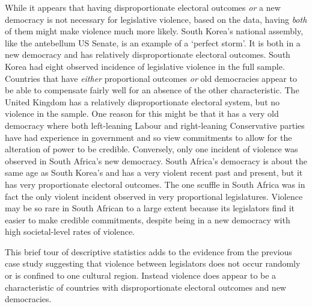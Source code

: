 \documentclass[a4paper]{article}\usepackage[]{graphicx}\usepackage[]{color}
\begin{document}
While it appears that having disproportionate electoral outcomes \emph{or} a new democracy is not necessary for legislative violence, based on the data, having \emph{both} of them might make violence much more likely. South Korea's national assembly, like the antebellum US Senate, is an example of a `perfect storm'. It is both in a new democracy and has relatively disproportionate electoral outcomes. South Korea had eight observed incidence of legislative violence in the full sample. Countries that have \emph{either} proportional outcomes \emph{or} old democracies appear to be able to compensate fairly well for an absence of the other characteristic. The United Kingdom has a relatively disproportionate electoral system, but no violence in the sample. One reason for this might be that it has a very old democracy where both left-leaning Labour and right-leaning Conservative parties have had experience in government and so view commitments to allow for the alteration of power to be credible.  Conversely, only one incident of violence was observed in South Africa's new democracy. South Africa's democracy is about the same age as South Korea's and has a very violent recent past and present, but it has very proportionate electoral outcomes. The one scuffle in South Africa was in fact the only violent incident observed in very proportional legislatures. Violence may be so rare in South African to a large extent because its legislators find it easier to make credible commitments, despite being in a new democracy with high societal-level rates of violence.

This brief tour of descriptive statistics adds to the evidence from the previous case study suggesting that violence between legislators does not occur randomly or is confined to one cultural region. Instead violence does appear to be a characteristic of countries with disproportionate electoral outcomes and new democracies.
\end{document}
